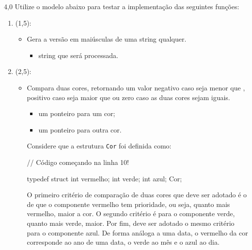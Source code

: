 \documentclass[
    12pt,     
    openright,
    twoside,  
    a4paper,  
    english,  
    brazil,   
]{memoir}
\begin{document}
\begin{questaoProgramacao}{4,0}{}{}
    Utilize o modelo abaixo para testar a implementação das seguintes funções:
    
    \begin{enumerate}
    
        \item {} (1,5):
        \begin{itemize}
            \item Gera a versão em maiúsculas de uma string qualquer.
            \begin{itemize}
                \item {} string que será processada.
            \end{itemize}
        \end{itemize}
        
        \item {} (2,5):
        \begin{itemize}
            \item Compara duas cores, retornando um valor negativo caso  seja menor que , positivo caso  seja maior que  ou zero caso as duas cores sejam iguais.
            \begin{itemize}
                \item {} um ponteiro para um cor;
                \item {} um ponteiro para outra cor.
            \end{itemize}
            Considere que a estrutura \texttt{Cor} foi definida como:
\begin{blocoC}[][10]
// Código começando na linha 10!

typedef struct {
    int vermelho;
    int verde;
    int azul;
} Cor;
\end{blocoC}
            O primeiro critério de comparação de duas cores que deve ser adotado é o de que o componente vermelho tem prioridade, ou seja, quanto mais vermelho, maior a cor. O segundo critério é para o componente verde, quanto mais verde, maior. Por fim, deve ser adotado o mesmo critério para o componente azul. De forma análoga a uma data, o vermelho da cor corresponde ao ano de uma data, o verde ao mês e o azul ao dia.
                \end{itemize}
    
    \end{enumerate}


\end{questaoProgramacao}
\end{document}
